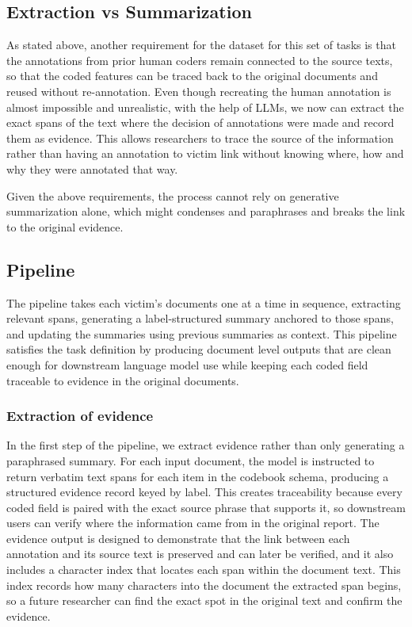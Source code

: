 \documentclass{article}
\begin{document}
\subsection{Extraction vs
Summarization}\label{extraction-vs-summarization}

As stated above, another requirement for the dataset for this set of
tasks is that the annotations from prior human coders remain connected
to the source texts, so that the coded features can be traced back to
the original documents and reused without re-annotation. Even though
recreating the human annotation is almost impossible and unrealistic,
with the help of LLMs, we now can extract the exact spans of the text
where the decision of annotations were made and record them as evidence.
This allows researchers to trace the source of the information rather
than having an annotation to victim link without knowing where, how and
why they were annotated that way.

Given the above requirements, the process cannot rely on generative
summarization alone, which might condenses and paraphrases and breaks
the link to the original evidence.

\subsection{Pipeline}\label{pipeline}

The pipeline takes each victim's documents one at a time in sequence,
extracting relevant spans, generating a label-structured summary
anchored to those spans, and updating the summaries using previous
summaries as context. This pipeline satisfies the task definition by
producing document level outputs that are clean enough for downstream
language model use while keeping each coded field traceable to evidence
in the original documents.

\subsubsection{Extraction of evidence}\label{extraction-of-evidence}

In the first step of the pipeline, we extract evidence rather than only
generating a paraphrased summary. For each input document, the model is
instructed to return verbatim text spans for each item in the codebook
schema, producing a structured evidence record keyed by label. This
creates traceability because every coded field is paired with the exact
source phrase that supports it, so downstream users can verify where the
information came from in the original report. The evidence output is
designed to demonstrate that the link between each annotation and its
source text is preserved and can later be verified, and it also includes
a character index that locates each span within the document text. This
index records how many characters into the document the extracted span
begins, so a future researcher can find the exact spot in the original
text and confirm the evidence.
\end{document}
